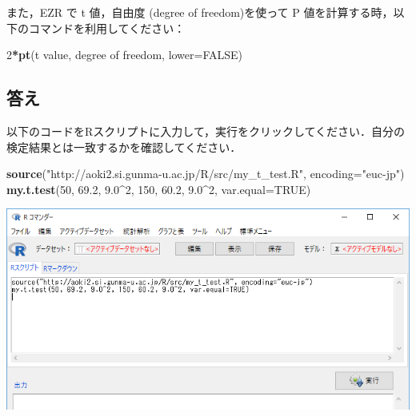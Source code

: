 \documentclass[11pt,]{problemset}
\newenvironment{Shaded}{\begin{snugshade}}{\end{snugshade}}
\newcommand{\KeywordTok}[1]{\textcolor[rgb]{0.13,0.29,0.53}{\textbf{#1}}}
\newcommand{\DataTypeTok}[1]{\textcolor[rgb]{0.13,0.29,0.53}{#1}}
\newcommand{\DecValTok}[1]{\textcolor[rgb]{0.00,0.00,0.81}{#1}}
\newcommand{\FloatTok}[1]{\textcolor[rgb]{0.00,0.00,0.81}{#1}}
\newcommand{\StringTok}[1]{\textcolor[rgb]{0.31,0.60,0.02}{#1}}
\newcommand{\OtherTok}[1]{\textcolor[rgb]{0.56,0.35,0.01}{#1}}
\newcommand{\OperatorTok}[1]{\textcolor[rgb]{0.81,0.36,0.00}{\textbf{#1}}}
\newcommand{\NormalTok}[1]{#1}
\begin{document}
また，EZR で t 値，自由度 (degree of freedom)を使って P
値を計算する時，以下のコマンドを利用してください：

\begin{Shaded}
\begin{Highlighting}[]
\DecValTok{2}\OperatorTok{*}\KeywordTok{pt}\NormalTok{(t value, degree of freedom, }\DataTypeTok{lower=}\OtherTok{FALSE}\NormalTok{)}
\end{Highlighting}
\end{Shaded}

\subsection{答え}

\newpage

\vfill

以下のコードをRスクリプトに入力して，実行をクリックしてください．自分の検定結果とは一致するかを確認してください．

\begin{Shaded}
\begin{Highlighting}[]
\KeywordTok{source}\NormalTok{(}\StringTok{"http://aoki2.si.gunma-u.ac.jp/R/src/my_t_test.R"}\NormalTok{, }\DataTypeTok{encoding=}\StringTok{"euc-jp"}\NormalTok{)}
\KeywordTok{my.t.test}\NormalTok{(}\DecValTok{50}\NormalTok{, }\FloatTok{69.2}\NormalTok{, }\FloatTok{9.0}\OperatorTok{^}\DecValTok{2}\NormalTok{, }\DecValTok{150}\NormalTok{, }\FloatTok{60.2}\NormalTok{, }\FloatTok{9.0}\OperatorTok{^}\DecValTok{2}\NormalTok{, }\DataTypeTok{var.equal=}\OtherTok{TRUE}\NormalTok{)}
\end{Highlighting}
\end{Shaded}

\bigskip\bigskip\bigskip\bigskip\bigskip\bigskip\bigskip

\begin{center}\includegraphics[width=0.9\linewidth]{pic/myttest01cut} \end{center}
\end{document}
